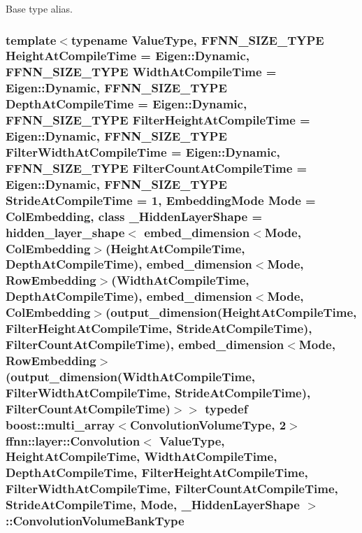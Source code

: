 Base type alias. 

\hypertarget{classffnn_1_1layer_1_1_convolution_a9cec43e24f084c141c0cc8ae3c046ff4}{
\subsubsection[{Convolution\-Volume\-Bank\-Type}]{\setlength{\rightskip}{0pt plus 5cm}template$<$typename Value\-Type, F\-F\-N\-N\-\_\-\-S\-I\-Z\-E\-\_\-\-T\-Y\-P\-E Height\-At\-Compile\-Time = Eigen\-::\-Dynamic, F\-F\-N\-N\-\_\-\-S\-I\-Z\-E\-\_\-\-T\-Y\-P\-E Width\-At\-Compile\-Time = Eigen\-::\-Dynamic, F\-F\-N\-N\-\_\-\-S\-I\-Z\-E\-\_\-\-T\-Y\-P\-E Depth\-At\-Compile\-Time = Eigen\-::\-Dynamic, F\-F\-N\-N\-\_\-\-S\-I\-Z\-E\-\_\-\-T\-Y\-P\-E Filter\-Height\-At\-Compile\-Time = Eigen\-::\-Dynamic, F\-F\-N\-N\-\_\-\-S\-I\-Z\-E\-\_\-\-T\-Y\-P\-E Filter\-Width\-At\-Compile\-Time = Eigen\-::\-Dynamic, F\-F\-N\-N\-\_\-\-S\-I\-Z\-E\-\_\-\-T\-Y\-P\-E Filter\-Count\-At\-Compile\-Time = Eigen\-::\-Dynamic, F\-F\-N\-N\-\_\-\-S\-I\-Z\-E\-\_\-\-T\-Y\-P\-E Stride\-At\-Compile\-Time = 1, Embedding\-Mode Mode = Col\-Embedding, class \-\_\-\-Hidden\-Layer\-Shape = hidden\-\_\-layer\-\_\-shape$<$              embed\-\_\-dimension$<$\-Mode, Col\-Embedding$>$(\-Height\-At\-Compile\-Time, Depth\-At\-Compile\-Time),              embed\-\_\-dimension$<$\-Mode, Row\-Embedding$>$(\-Width\-At\-Compile\-Time,  Depth\-At\-Compile\-Time),              embed\-\_\-dimension$<$\-Mode, Col\-Embedding$>$(output\-\_\-dimension(\-Height\-At\-Compile\-Time, Filter\-Height\-At\-Compile\-Time, Stride\-At\-Compile\-Time), Filter\-Count\-At\-Compile\-Time),              embed\-\_\-dimension$<$\-Mode, Row\-Embedding$>$(output\-\_\-dimension(\-Width\-At\-Compile\-Time,  Filter\-Width\-At\-Compile\-Time,  Stride\-At\-Compile\-Time), Filter\-Count\-At\-Compile\-Time)$>$$>$ typedef boost\-::multi\-\_\-array$<${\bf Convolution\-Volume\-Type}, 2$>$ {\bf ffnn\-::layer\-::\-Convolution}$<$ Value\-Type, Height\-At\-Compile\-Time, Width\-At\-Compile\-Time, Depth\-At\-Compile\-Time, Filter\-Height\-At\-Compile\-Time, Filter\-Width\-At\-Compile\-Time, Filter\-Count\-At\-Compile\-Time, Stride\-At\-Compile\-Time, Mode, \-\_\-\-Hidden\-Layer\-Shape $>$\-::{\bf Convolution\-Volume\-Bank\-Type}}}\label{classffnn_1_1layer_1_1_convolution_a9cec43e24f084c141c0cc8ae3c046ff4}


